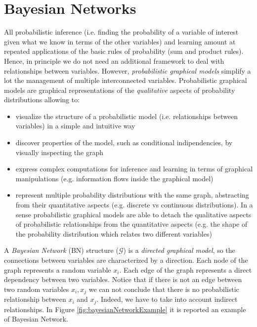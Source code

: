 \chapter{Bayesian Networks}
\label{cha:bay_net} All probabilistic inference (i.e. finding the probability of
a variable of interest given what we know in terms of the other variables) and
learning amount at repeated applications of the basic rules of probability (sum and
product rules). Hence, in principle we do not need an additional framework to
deal with relationships between variables. However, \textit{probabilistic
graphical models} simplify a lot the management of multiple interconnected variables.
Probabilistic graphical models are graphical representations of the \textit{qualitative}
aspects of probability distributions allowing to:
\begin{itemize}
	\item visualize the structure of a probabilistic model (i.e. relationships between
		variables) in a simple and intuitive way

	\item discover properties of the model, such as conditional indipendencies, by
		visually inspecting the graph

	\item express complex computations for inference and learning in terms of graphical
		manipulations (e.g. information flows inside the graphical model)

	\item represent multiple probability distributions with the same graph,
		abstracting from their quantitative aspects (e.g. discrete vs continuous
		distributions). In a sense probabilistic graphical models are able to detach
		the qualitative aspects of probabilistic relationships from the quantitative
		aspects (e.g. the shape of the probability distribution which relates two
		different variables)
\end{itemize}

A \textit{Bayesian Network} (BN) structure ($\mathcal{G}$) is a \textit{directed
graphical model}, so the connections between variables are characterized by a
direction. Each node of the graph represents a random variable $x_{i}$. Each
edge of the graph represents a direct dependency between two variables. Notice that
if there is not an edge between two random variables $x_{i}, x_{j}$ we can not conclude
that there is no probabilistic relationship between $x_{i}$ and $x_{j}$. Indeed,
we have to take into account indirect relationships. In Figure
\ref{fig:bayesianNetworkExample} it is reported an example of Bayesian Network.
\newline

